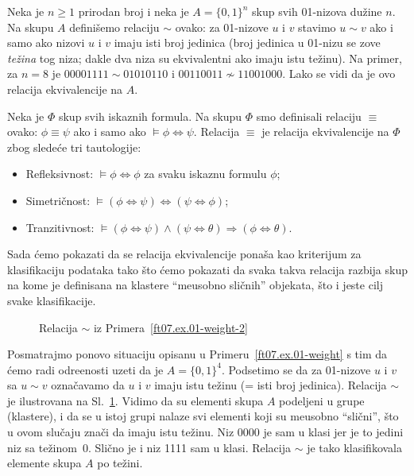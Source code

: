 \begin{EX}\label{ft07.ex.01-weight}
  Neka je $n \ge 1$ prirodan broj i neka je $A = \{0,1\}^n$ skup svih 01-nizova du\v zine $n$. Na skupu $A$ defini\v semo
  relaciju $\sim$ ovako: za 01-nizove $u$ i $v$ stavimo $u \sim v$ ako i samo ako nizovi $u$ i $v$ imaju isti broj jedinica
  (broj jedinica u 01-nizu se zove \emph{te\v zina} tog niza; dakle dva niza su ekvivalentni ako imaju istu te\v zinu).
  Na primer, za $n = 8$ je $00001111 \sim 01010110$ i $00110011 \not\sim 11001000$.
  Lako se vidi da je ovo relacija ekvivalencije na $A$.
\end{EX}

\begin{EX}\label{ft07.ex.iskazne-fle}
  Neka je $\Phi$ skup svih iskaznih formula. Na skupu $\Phi$ smo definisali relaciju $\equiv$ ovako:
  $\phi \equiv \psi$ ako i samo ako $\vDash \phi \Leftrightarrow \psi$. Relacija $\equiv$ je relacija
  ekvivalencije na $\Phi$ zbog slede\'ce tri tautologije:
  \begin{itemize}\itemsep -1.5pt
  \item
    Refleksivnost: $\vDash \phi \Leftrightarrow \phi$ za svaku iskaznu formulu $\phi$;
  \item
    Simetri\v cnost: $\vDash (\phi \Leftrightarrow \psi) \Leftrightarrow (\psi \Leftrightarrow \phi)$;
  \item
    Tranzitivnost: $\vDash (\phi \Leftrightarrow \psi) \land (\psi \Leftrightarrow \theta) \Rightarrow (\phi \Leftrightarrow \theta)$.
  \end{itemize}
\end{EX}

Sada \'cemo pokazati da se relacija ekvivalencije pona\v sa kao kriterijum za klasifikaciju
podataka tako \v sto \'cemo pokazati da svaka takva relacija razbija skup na kome je definisana
na klastere \enquote{me\dj usobno sli\v cnih} objekata, \v sto i jeste cilj svake klasifikacije.

\begin{figure}
  \centering
  
  \caption{Relacija $\sim$ iz Primera~\ref{ft07.ex.01-weight-2}}
  \label{ds1.sl.01-4}
\end{figure}

\begin{EX}\label{ft07.ex.01-weight-2}
  Posmatrajmo ponovo situaciju opisanu u Primeru~\ref{ft07.ex.01-weight} s tim da \'cemo radi odre\dj enosti
  uzeti da je $A = \{0,1\}^4$. Podsetimo se da za 01-nizove $u$ i $v$ sa $u \sim v$ ozna\v cavamo
  da $u$ i $v$ imaju istu te\v zinu (= isti broj jedinica). Relacija $\sim$ je ilustrovana na Sl.~\ref{ds1.sl.01-4}.
  Vidimo da su elementi skupa $A$ podeljeni u grupe (klastere), i da se u istoj grupi nalaze
  svi elementi koji su me\dj usobno \enquote{sli\v cni}, \v sto u ovom slu\v caju zna\v ci da imaju istu
  te\v zinu. Niz 0000 je sam u klasi jer je to jedini niz sa te\v zinom~0. Sli\v cno je i niz 1111
  sam u klasi. Relacija $\sim$ je tako klasifikovala elemente skupa $A$ po te\v zini.
\end{EX}

